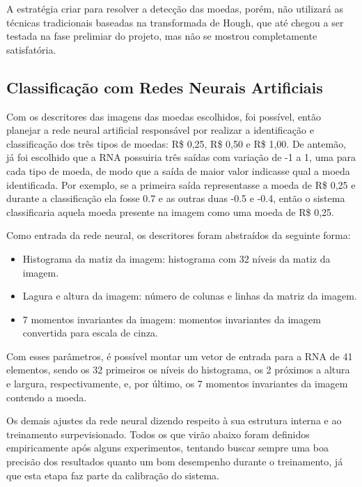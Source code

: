 \documentclass[10pt,journal,compsoc]{IEEEtran}
\begin{document}
A estratégia criar para resolver a detecção das moedas, porém, não utilizará as técnicas tradicionais baseadas na transformada de Hough, que até chegou a ser testada na fase prelimiar do projeto, mas não se mostrou completamente satisfatória.



\subsection{Classificação com Redes Neurais Artificiais}
\label{sec:metodologia:rna}



Com os descritores das imagens das moedas escolhidos, foi possível, então planejar a rede neural artificial responsável por realizar a identificação e classificação dos três tipos de moedas: R\$ 0,25, R\$ 0,50 e R\$ 1,00. De antemão, já foi escolhido que a RNA possuiria três saídas com variação de -1 a 1, uma para cada tipo de moeda, de modo que a saída de maior valor indicasse qual a moeda identificada. Por exemplo, se a primeira saída representasse a moeda de R\$ 0,25 e durante a classificação ela fosse 0.7 e as outras duas -0.5 e -0.4, então o sistema classificaria aquela moeda presente na imagem como uma moeda de R\$ 0,25.

Como entrada da rede neural, os descritores foram abstraídos da seguinte forma:

\begin{itemize}  
\item Histograma da matiz da imagem: histograma com 32 níveis da matiz da imagem.
\item Lagura e altura da imagem: número de colunas e linhas da matriz da imagem.
\item 7 momentos invariantes da imagem: momentos invariantes da imagem convertida para escala de cinza.
\end{itemize}

Com esses parâmetros, é possível montar um vetor de entrada para a RNA  de 41 elementos, sendo os 32 primeiros os níveis do histograma, os 2 próximos a altura e largura, respectivamente, e, por último, os 7 momentos invariantes da imagem contendo a moeda. 

Os demais ajustes da rede neural dizendo respeito à sua estrutura interna e ao treinamento surpevisionado. Todos os que virão abaixo foram definidos empiricamente após alguns experimentos, tentando buscar sempre uma boa precisão dos resultados quanto um bom desempenho durante o treinamento, já que esta etapa faz parte da calibração do sistema.
\end{document}
